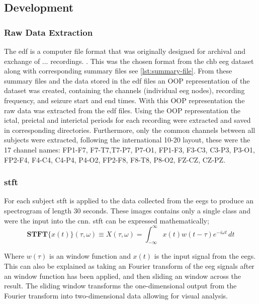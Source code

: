 \documentclass[12pt]{article}
\begin{document}
\subsection{Development}

\subsubsection{Raw Data Extraction}

The \acrfull{edf} \cite{kemp1992simple} is a computer file format that was originally designed for archival and exchange  of ... recordings. \cite{kemp2013european}. This was the chosen format from the \acrshort{chb} \acrshort{eeg} dataset along with corresponding summary files see \ref{lst:summary-file}. From these summary files and the data stored in the \acrshort{edf} files an OOP representation of the dataset was created, containing the channels (individual \acrshort{eeg} nodes), recording frequency, and seizure start and end times. With this OOP representation the raw data was extracted from the \acrshort{edf} files. Using the OOP representation the ictal, preictal and interictal periods for each recording were extracted and saved in corresponding directories. Furthermore, only the common channels between all subjects were extracted, following the international 10-20 layout, these were the 17 channel names: FP1-F7, F7-T7,T7-P7, P7-O1, FP1-F3, F3-C3, C3-P3, P3-O1, FP2-F4, F4-C4, C4-P4, P4-O2, FP2-F8, F8-T8, P8-O2, FZ-CZ, CZ-PZ.

\subsubsection{\acrfull{stft}}

For each subject \acrshort{stft} is applied to the data collected from the \acrshort{eegs} to produce an spectrogram of length 30 seconds. These images contains only a single class and were the input into the \acrshort{cnn}. \acrshort{stft} can be expressed mathematically;\\ 

$$ \mathbf{STFT}\{x(t)\}(\tau,\omega) \equiv X(\tau, \omega) = \int_{-\infty}^{\infty} x(t) w(t-\tau) e^{-i \omega t} \, d t  $$


Where $w(\tau)$ is an window function and $x(t)$ is the input signal from the \acrshort{eegs}.\\


This can also be explained as taking an Fourier transform of the \acrshort{eeg} signals after an window function has been applied, and then sliding an window across the result. The sliding window transforms the one-dimensional output from the Fourier transform into two-dimensional data allowing for visual analysis. 
\end{document}

